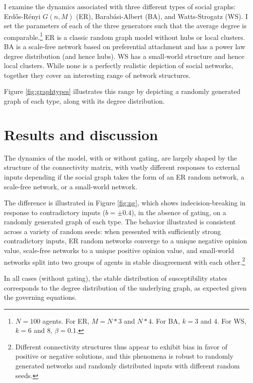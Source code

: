 \documentclass[]{article}
\begin{document}
I examine the dynamics associated with three different types of social graphs: Erdős-Rényi $G(n, M)$ (ER), Barabási-Albert (BA), and Watts-Strogatz (WS). I set the parameters of each of the three generators such that the average degree is comparable.\footnote{$N = 100$ agents. For ER, $M = N*3$ and $N*4$. For BA, $k = 3$ and $4$. For WS, $k = 6$ and $8$, $\beta = 0.1$.} ER is a classic random graph model without hubs or local clusters. BA is a scale-free network based on preferential attachment and has a power law degree distribution (and hence hubs). WS has a small-world structure and hence local clusters. While none is a perfectly realistic depiction of social networks, together they cover an interesting range of network structures.

Figure \ref{fig:graphtypes} illustrates this range by depicting a randomly generated graph of each type, along with its degree distribution.

\section{Results and discussion}

The dynamics of the model, with or without gating, are largely shaped by the structure of the connectivity matrix, with vastly different responses to external inputs depending if the social graph takes the form of an ER random network, a scale-free network, or a small-world network. 

The difference is illustrated in Figure \ref{fig:ng}, which shows indecision-breaking in response to contradictory inputs ($b = \pm 0.4$), in the absence of gating, on a randomly generated graph of each type. The behavior illustrated is consistent across a variety of random seeds: when presented with sufficiently strong contradictory inputs, ER random networks converge to a unique negative opinion value, scale-free networks to a unique positive opinion value, and small-world networks split into two groups of agents in stable disagreement with each other.\footnote{Different connectivity structures thus appear to exhibit bias in favor of positive or negative solutions, and this phenomena is robust to randomly generated networks and randomly distributed inputs with different random seeds.}

In all cases (without gating), the stable distribution of susceptibility states corresponds to the degree distribution of the underlying graph, as expected given the governing equations.
\end{document}
